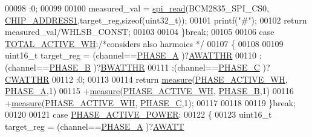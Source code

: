 \begin{DoxyCode}
00098                                           :0;           
00099                                           
00100                     measured\_val = \hyperlink{a00006_ga7ad9f65ee46aca507374096506a0b1c4}{spi\_read}(BCM2835\_SPI\_CS0,
      \hyperlink{a00036_a94de2b046db6e10257ef4481c0a15eaa}{CHIP\_ADDRESS1},target\_reg,\textcolor{keyword}{sizeof}(uint32\_t));
00101                     printf(\textcolor{stringliteral}{"#"});
00102                     \textcolor{keywordflow}{return} measured\_val/WHLSB\_CONST;
00103                 
00104                 \}\textcolor{keywordflow}{break};
00105                 
00106                 \textcolor{keywordflow}{case}  \hyperlink{a00042_ad8d2fc353ef124a8144e6d8264e43d1a}{TOTAL\_ACTIVE\_WH}:\textcolor{comment}{/*considers also harmoics */}
00107                 \{
00108                     
00109                     uint16\_t target\_reg =  (channel==\hyperlink{a00042_ad214039f52b011ce2bd6c85ff98a981b}{PHASE\_A} )?\hyperlink{a00035_ae66c97ed86f47fd938f143a30a8b2f7e}{AWATTHR}
00110                                           :(channel==\hyperlink{a00042_ad7b96feed1e1c12515dad5e926b2c62e}{PHASE\_B} )?\hyperlink{a00035_a185c6910fa47f7e973f0f8743ef0e8ad}{BWATTHR}
00111                                           :(channel==\hyperlink{a00042_a3ceb83fb10c2af19b468d508448f24e2}{PHASE\_C} )?\hyperlink{a00035_ad685baf76950c0387bedffa9bb3272a9}{CWATTHR}
00112                                           :0;           
00113                     
00114                      \textcolor{keywordflow}{return}  \hyperlink{a00008_gac914ebaa64afce03ee852af09659cf69}{measure}(\hyperlink{a00042_a4ee773ad07fa969b9990f9bb3a1a2093}{PHASE\_ACTIVE\_WH},
      \hyperlink{a00042_ad214039f52b011ce2bd6c85ff98a981b}{PHASE\_A},1)
00115                             +\hyperlink{a00008_gac914ebaa64afce03ee852af09659cf69}{measure}(\hyperlink{a00042_a4ee773ad07fa969b9990f9bb3a1a2093}{PHASE\_ACTIVE\_WH},
      \hyperlink{a00042_ad7b96feed1e1c12515dad5e926b2c62e}{PHASE\_B},1)
00116                             +\hyperlink{a00008_gac914ebaa64afce03ee852af09659cf69}{measure}(\hyperlink{a00042_a4ee773ad07fa969b9990f9bb3a1a2093}{PHASE\_ACTIVE\_WH},
      \hyperlink{a00042_a3ceb83fb10c2af19b468d508448f24e2}{PHASE\_C},1);
00117                      
00118                 
00119                 \}\textcolor{keywordflow}{break};
00120                 
00121                 \textcolor{keywordflow}{case}  \hyperlink{a00042_abd3f95c7cd63d0627552d293bf49e026}{PHASE\_ACTIVE\_POWER}:
00122                 \{
00123                     uint16\_t target\_reg =    (channel==\hyperlink{a00042_ad214039f52b011ce2bd6c85ff98a981b}{PHASE\_A} )?\hyperlink{a00035_a70d4c8c1577490f1b69cfab591458142}{AWATT}

\end{DoxyCode}
